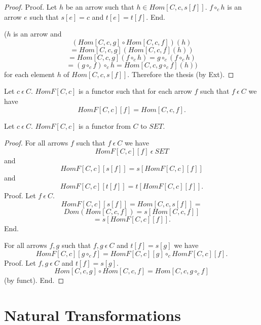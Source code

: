 \documentclass{article}
\newcommand{\mcirc}{\circ_{c}}
\newcommand{\inn}{~\epsilon~}
\newcommand{\innn}{~\epsilon~} %
\begin{document}
\begin{forthel}
\begin{proof}
		  Proof. 
		  Let $h$ be an arrow such that $h \in Hom[C,c,s[f]]$.
		  $f \mcirc h$ is an arrow $e$ such that $s[e]=c$ and $t[e]=t[f]$. End.
		  
		($h$ is an arrow and
		  $$(Hom[C,c,g] \circ Hom[C,c,f])(h)$$
		  $$=Hom[C,c,g](Hom[C,c,f](h))$$
		  $$=Hom[C,c,g](f \mcirc h) =g \mcirc (f \mcirc h)$$
		  $$ = (g \mcirc f) \mcirc h = Hom[C,c,g \mcirc f](h))$$ for each element $h$ of $Hom[C,c,s[f]]$.
		  Therefore the thesis (by Ext).
		\end{proof}
		

		
		\begin{definition} 
			Let $c \innn C$.
			$HomF[C,c]$ is a functor such that 
			for each arrow $f$ such that $f \inn C$ we have $$HomF[C,c][f] = Hom[C,c,f].$$
		\end{definition}
		
		
		
		\begin{theorem} 
			Let $c \innn C$. 
			$HomF[C,c]$ is a functor from $C$ to $SET$.
		\end{theorem}
		\begin{proof}
			
			For all arrows $f$ such that $f \inn C$ we have
			$$HomF[C,c][f] \inn SET$$
			and $$HomF[C,c][s[f]] = s[HomF[C,c][f]]$$
			and $$HomF[C,c][t[f]] = t[HomF[C,c][f]].$$
			Proof.
			  Let $f\innn C$.
			  $$HomF[C,c][s[f]] = Hom[C,c,s[f]]= $$
			  $$Dom(Hom[C,c,f]) = s[Hom[C,c,f]] $$
			  $$= s[HomF[C,c][f]].$$
			End.
			
			For all arrows $f,g$ such that $f,g \inn C$ and $t[f]=s[g]$ we have
			$$HomF[C,c][g \mcirc f] = HomF[C,c][g] \mcirc HomF[C,c][f].$$
			Proof. Let $f,g \innn C$ and $t[f]=s[g]$.
			  $$Hom[C,c,g] \circ Hom[C,c,f] = Hom[C,c,g \mcirc f]$$ (by funct).
			End.
			
		\end{proof}




		
	\end{forthel}
	

	\section{Natural Transformations}
	
\end{document}
